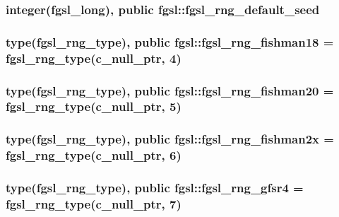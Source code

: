 \subsubsection[{fgsl\+\_\+rng\+\_\+default\+\_\+seed}]{\setlength{\rightskip}{0pt plus 5cm}integer({\bf fgsl\+\_\+long}), public fgsl\+::fgsl\+\_\+rng\+\_\+default\+\_\+seed}\label{namespacefgsl_a26af265921be65d7d401bd4865dfe221}
\hypertarget{namespacefgsl_a8f22f1b0b7e5d37d485553834c96b959}{}
\subsubsection[{fgsl\+\_\+rng\+\_\+fishman18}]{\setlength{\rightskip}{0pt plus 5cm}type({\bf fgsl\+\_\+rng\+\_\+type}), public fgsl\+::fgsl\+\_\+rng\+\_\+fishman18 = {\bf fgsl\+\_\+rng\+\_\+type}(c\+\_\+null\+\_\+ptr, 4)}\label{namespacefgsl_a8f22f1b0b7e5d37d485553834c96b959}
\hypertarget{namespacefgsl_aaa1400ecb0b7757a72553cd766ac5880}{}
\subsubsection[{fgsl\+\_\+rng\+\_\+fishman20}]{\setlength{\rightskip}{0pt plus 5cm}type({\bf fgsl\+\_\+rng\+\_\+type}), public fgsl\+::fgsl\+\_\+rng\+\_\+fishman20 = {\bf fgsl\+\_\+rng\+\_\+type}(c\+\_\+null\+\_\+ptr, 5)}\label{namespacefgsl_aaa1400ecb0b7757a72553cd766ac5880}
\hypertarget{namespacefgsl_a6564b2d833a35c41a82dc834f2cc3263}{}
\subsubsection[{fgsl\+\_\+rng\+\_\+fishman2x}]{\setlength{\rightskip}{0pt plus 5cm}type({\bf fgsl\+\_\+rng\+\_\+type}), public fgsl\+::fgsl\+\_\+rng\+\_\+fishman2x = {\bf fgsl\+\_\+rng\+\_\+type}(c\+\_\+null\+\_\+ptr, 6)}\label{namespacefgsl_a6564b2d833a35c41a82dc834f2cc3263}
\hypertarget{namespacefgsl_a12158a5916e899c6bf9c9ceee7352105}{}
\subsubsection[{fgsl\+\_\+rng\+\_\+gfsr4}]{\setlength{\rightskip}{0pt plus 5cm}type({\bf fgsl\+\_\+rng\+\_\+type}), public fgsl\+::fgsl\+\_\+rng\+\_\+gfsr4 = {\bf fgsl\+\_\+rng\+\_\+type}(c\+\_\+null\+\_\+ptr, 7)}\label{namespacefgsl_a12158a5916e899c6bf9c9ceee7352105}
\hypertarget{namespacefgsl_af73840b5889e5a54be83e7596d5973c0}{}

